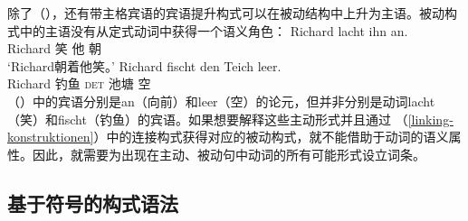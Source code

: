 除了（），还有带主格宾语的宾语提升构式可以在被动结构中上升为主语。被动构式中的主语没有从定式动词中获得一个语义角色：
\eal
\ex
\gll Richard lacht ihn an.\\
     Richard 笑 他 朝\\
\glt `Richard朝着他笑。'
\ex
\gll Richard fischt den Teich leer.\\
     Richard 钓鱼 \textsc{det} 池塘 空\\
\zl
 （）中的宾语分别是an（向前）和leer（空）的论元，但并非分别是动词lacht（笑）和fischt（钓鱼）的宾语。如果想要解释这些主动形式并且通过 （\ref{linking-konstruktionen}）中的连接构式获得对应的被动构式，就不能借助于动词的语义属性。因此，就需要为出现在主动、被动句中动词的所有可能形式设立词条。

\subsection{基于符号的构式语法}
\label{sec-SbCxG}\label{sec-sbcg}\label{sec-SBCG}

